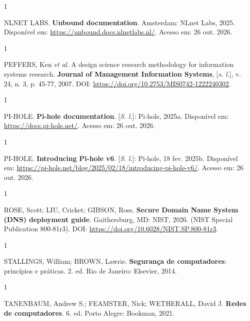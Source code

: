 \documentclass[12pt,a4paper]{article}
\begin{document}
\begin{spacing}{1}\raggedright\noindent NLNET LABS. \textbf{Unbound documentation}. Amsterdam: NLnet Labs, 2025. Disponível em: \url{https://unbound.docs.nlnetlabs.nl/}. Acesso em: 26 out. 2026.\par\vspace{12pt}\end{spacing}
\begin{spacing}{1}\raggedright\noindent PEFFERS, Ken \textit{et al}. A design science research methodology for information systems research. \textbf{Journal of Management Information Systems}, [\textit{s. l.}], v. 24, n. 3, p. 45-77, 2007. DOI: \url{https://doi.org/10.2753/MIS0742-1222240302}.\par\vspace{12pt}\end{spacing}
\begin{spacing}{1}\raggedright\noindent PI-HOLE. \textbf{Pi-hole documentation}. [\textit{S. l.}]: Pi-hole, 2025a. Disponível em: \url{https://docs.pi-hole.net/}. Acesso em: 26 out. 2026.\par\vspace{12pt}\end{spacing}
\begin{spacing}{1}\raggedright\noindent PI-HOLE. \textbf{Introducing Pi-hole v6}. [\textit{S. l.}]: Pi-hole, 18 fev. 2025b. Disponível em: \url{https://pi-hole.net/blog/2025/02/18/introducing-pi-hole-v6/}. Acesso em: 26 out. 2026.\par\vspace{12pt}\end{spacing}
\begin{spacing}{1}\raggedright\noindent ROSE, Scott; LIU, Cricket; GIBSON, Ross. \textbf{Secure Domain Name System (DNS) deployment guide}. Gaithersburg, MD: NIST, 2026. (NIST Special Publication 800-81r3). DOI: \url{https://doi.org/10.6028/NIST.SP.800-81r3}.\par\vspace{12pt}\end{spacing}
\begin{spacing}{1}\raggedright\noindent STALLINGS, William; BROWN, Lawrie. \textbf{Segurança de computadores}: princípios e práticas. 2. ed. Rio de Janeiro: Elsevier, 2014.\par\vspace{12pt}\end{spacing}
\begin{spacing}{1}\raggedright\noindent TANENBAUM, Andrew S.; FEAMSTER, Nick; WETHERALL, David J. \textbf{Redes de computadores}. 6. ed. Porto Alegre: Bookman, 2021.\par\vspace{12pt}\end{spacing}
\end{document}
